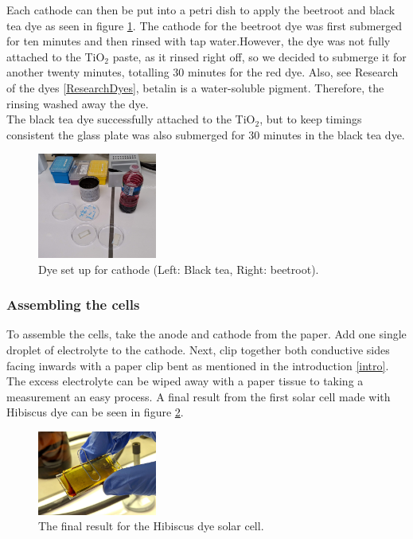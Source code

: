 \documentclass[conference]{IEEEtran}
\begin{document}
Each cathode can then be put into a petri dish to apply the beetroot and black tea dye as seen in figure \ref{fig:dyesetup}. The cathode for the beetroot dye was first submerged for ten minutes and then rinsed with tap water.However, the dye was not fully attached to the TiO$_2$ paste, as it rinsed right off, so we decided to submerge it for another twenty minutes, totalling 30 minutes for the red dye. Also, see Research of the dyes \ref{ResearchDyes}, betalin is a water-soluble pigment. Therefore, the rinsing washed away the dye.\\

The black tea dye successfully attached to the TiO$_2$, but to keep timings consistent the glass plate was also submerged for 30 minutes in the black tea dye.

\begin{figure}[H]
\centering
\includegraphics[width=0.35\textwidth]{12StartLab2.jpg}
\caption{Dye set up for cathode (Left: Black tea, Right: beetroot).}
\label{fig:dyesetup} %
\end{figure}

\subsubsection{Assembling the cells}
To assemble the cells, take the anode and cathode from the paper. Add one single droplet of electrolyte to the cathode. Next, clip together both conductive sides facing inwards with a paper clip bent as mentioned in the introduction \ref{intro}.
The excess electrolyte can be wiped away with a paper tissue to taking a measurement an easy process. A final result from the first solar cell made with Hibiscus dye can be seen in figure \ref{fig:resultsolarcell}.

\begin{figure}[H]
\centering
\includegraphics[width=0.35\textwidth]{10ElectroliteAndClamped.jpg}
\caption{The final result for the Hibiscus dye solar cell.}
\label{fig:resultsolarcell} %
\end{figure}
\end{document}
